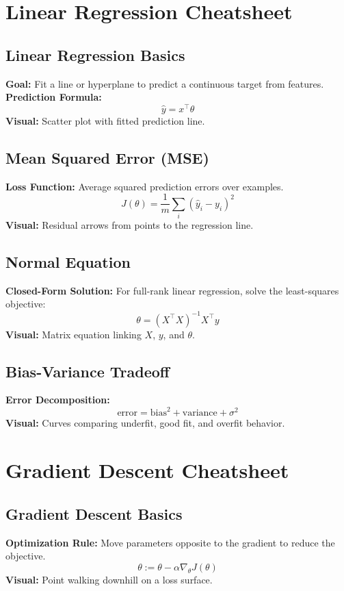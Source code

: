 \documentclass[10pt]{article}
\begin{document}
\section*{Linear Regression Cheatsheet}

\subsection*{Linear Regression Basics}
\textbf{Goal:} Fit a line or hyperplane to predict a continuous target from features.  
\textbf{Prediction Formula:}  
\[
\hat{y} = x^\top \theta
\]  
\textbf{Visual:} Scatter plot with fitted prediction line.

\subsection*{Mean Squared Error (MSE)}
\textbf{Loss Function:} Average squared prediction errors over examples.  
\[
J(\theta) = \frac{1}{m} \sum_i (\hat{y}_i - y_i)^2
\]  
\textbf{Visual:} Residual arrows from points to the regression line.

\subsection*{Normal Equation}
\textbf{Closed-Form Solution:} For full-rank linear regression, solve the least-squares objective:  
\[
\theta = (X^\top X)^{-1} X^\top y
\]  
\textbf{Visual:} Matrix equation linking \(X\), \(y\), and \(\theta\).

\subsection*{Bias-Variance Tradeoff}
\textbf{Error Decomposition:}  
\[
\mathrm{error} = \text{bias}^2 + \text{variance} + \sigma^2
\]  
\textbf{Visual:} Curves comparing underfit, good fit, and overfit behavior.

\section*{Gradient Descent Cheatsheet}

\subsection*{Gradient Descent Basics}
\textbf{Optimization Rule:} Move parameters opposite to the gradient to reduce the objective.  
\[
\theta := \theta - \alpha \nabla_\theta J(\theta)
\]  
\textbf{Visual:} Point walking downhill on a loss surface.
\end{document}
